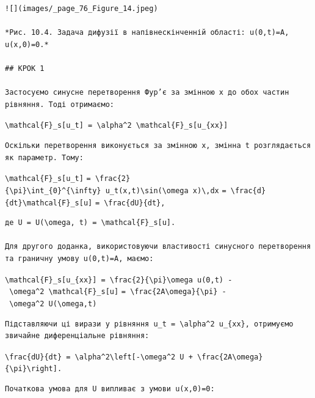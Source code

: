 \documentclass[
  ukrainian,
]{article}
\begin{document}
\begin{verbatim}
![](images/_page_76_Figure_14.jpeg)

*Рис. 10.4. Задача дифузії в напівнескінченній області: u(0,t)=A, u(x,0)=0.*  

## КРОК 1  

Застосуємо синусне перетворення Фур’є за змінною x до обох частин рівняння. Тоді отримаємо:
\end{verbatim}

\texttt{\textbackslash{}mathcal\{F\}\_s{[}u\_t{]}\ =\ \textbackslash{}alpha\^{}2\ \textbackslash{}mathcal\{F\}\_s{[}u\_\{xx\}{]}}

\begin{verbatim}
Оскільки перетворення виконується за змінною x, змінна t розглядається як параметр. Тому:
\end{verbatim}

\texttt{\textbackslash{}mathcal\{F\}\_s{[}u\_t{]}}
\texttt{=\ \textbackslash{}frac\{2\}\{\textbackslash{}pi\}\textbackslash{}int\_\{0\}\^{}\{\textbackslash{}infty\}\ u\_t(x,t)\textbackslash{}sin(\textbackslash{}omega\ x)\textbackslash{},dx}
\texttt{=\ \textbackslash{}frac\{d\}\{dt\}\textbackslash{}mathcal\{F\}\_s{[}u{]}}
\texttt{=\ \textbackslash{}frac\{dU\}\{dt\},}

\begin{verbatim}
де U = U(\omega, t) = \mathcal{F}_s[u].  

Для другого доданка, використовуючи властивості синусного перетворення та граничну умову u(0,t)=A, маємо:
\end{verbatim}

\texttt{\textbackslash{}mathcal\{F\}\_s{[}u\_\{xx\}{]}\ =\ \textbackslash{}frac\{2\}\{\textbackslash{}pi\}\textbackslash{}omega\ u(0,t)\ -\ \textbackslash{}omega\^{}2\ \textbackslash{}mathcal\{F\}\_s{[}u{]}}
\texttt{=\ \textbackslash{}frac\{2A\textbackslash{}omega\}\{\textbackslash{}pi\}\ -\ \textbackslash{}omega\^{}2\ U(\textbackslash{}omega,t)}

\begin{verbatim}
Підставляючи ці вирази у рівняння u_t = \alpha^2 u_{xx}, отримуємо звичайне диференціальне рівняння:
\end{verbatim}

\texttt{\textbackslash{}frac\{dU\}\{dt\}\ =\ \textbackslash{}alpha\^{}2\textbackslash{}left{[}-\textbackslash{}omega\^{}2\ U\ +\ \textbackslash{}frac\{2A\textbackslash{}omega\}\{\textbackslash{}pi\}\textbackslash{}right{]}.}

\begin{verbatim}
Початкова умова для U випливає з умови u(x,0)=0:
\end{verbatim}
\end{document}
